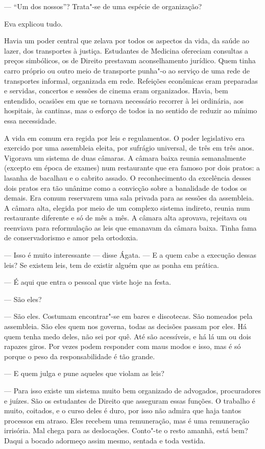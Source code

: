 --- ``Um dos nossos''? Trata"-se de uma espécie de organização?

Eva explicou tudo.

Havia um poder central que zelava por todos os aspectos da vida, da
saúde ao lazer, dos transportes à justiça. Estudantes de Medicina
ofereciam consultas a preços simbólicos, os de Direito prestavam
aconselhamento jurídico. Quem tinha carro próprio ou outro meio de
transporte punha"-o ao serviço de uma rede de transportes informal,
organizada em rede. Refeições econômicas eram preparadas e servidas,
concertos e sessões de cinema eram organizados. Havia, bem entendido,
ocasiões em que se tornava necessário recorrer à lei ordinária, aos
hospitais, às cantinas, mas o esforço de todos ia no sentido de reduzir
ao mínimo essa necessidade.

A vida em comum era regida por leis e regulamentos. O poder legislativo
era exercido por uma assembleia eleita, por sufrágio universal, de três
em três anos. Vigorava um sistema de duas câmaras. A câmara baixa reunia
semanalmente (excepto em época de exames) num restaurante que era
famoso por dois pratos: a lasanha de bacalhau e o cabrito assado. O
reconhecimento da excelência desses dois pratos era tão unânime como a
convicção sobre a banalidade de todos os demais. Era comum reservarem
uma sala privada para as sessões da assembleia. A câmara alta, elegida
por meio de um complexo sistema indireto, reunia num restaurante
diferente e só de mês a mês. A câmara alta aprovava, rejeitava ou
reenviava para reformulação as leis que emanavam da câmara baixa. Tinha fama
de conservadorismo e amor pela ortodoxia.

--- Isso é muito interessante --- disse Ágata. --- E a quem cabe a
  execução dessas leis? Se existem leis, tem de existir alguém que as
  ponha em prática.

--- É aqui que entra o pessoal que viste hoje na festa.

--- São eles?

--- São eles. Costumam encontrar"-se em bares e discotecas. São nomeados
  pela assembleia. São eles quem nos governa, todas as decisões passam
  por eles. Há quem tenha medo deles, não sei por quê. Até são
  acessíveis, e há lá um ou dois rapazes giros. Por vezes podem
  responder com maus modos e isso, mas é só porque o peso da
  responsabilidade é tão grande.

--- E quem julga e pune aqueles que violam as leis?

--- Para isso existe um sistema muito bem organizado de advogados,
  procuradores e juízes. São os estudantes de Direito que asseguram
  essas funções. O trabalho é muito, coitados, e o curso deles é duro,
  por isso não admira que haja tantos processos em atraso. Eles
  recebem uma remuneração, mas é uma remuneração irrisória. Mal chega
  para as deslocações. Conto"-te o resto amanhã, está bem? Daqui a bocado
  adormeço assim mesmo, sentada e toda vestida.

